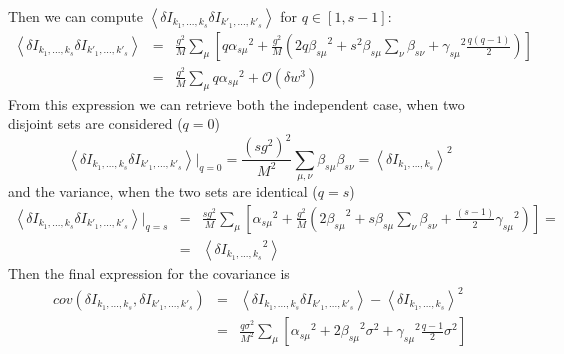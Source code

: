 \documentclass[11pt,letterpaper]{article}
\begin{document}
Then we can compute $\left\langle \delta I_{k_{1},...,k_{s}} \delta I_{k'_{1},...,k'_{s}} \right\rangle$ for $q\in [1,s-1]$:
\begin{eqnarray*}
     \left\langle \delta I_{k_{1},...,k_{s}} \delta I_{k'_{1},...,k'_{s}} \right\rangle &
    = & \frac{g^{2}}{M}\sum_{\mu}\left[ q{\alpha_{s\mu}}^{2} + \frac{g^{2}}{M}\left( 2q{\beta_{s\mu}}^{2} + s^{2} \beta_{s\mu}\sum_{\nu} \beta_{s\nu} + {\gamma_{s\mu}}^{2}\frac{q(q-1)}{2}\right)\right]\\
    &=& \frac{g^{2}}{M}\sum_{\mu} q{\alpha_{s\mu}}^{2} + \mathcal{O}(\delta w^3)
\end{eqnarray*}
From this expression we can retrieve both the independent case, when two disjoint sets are considered ($q=0$)
\begin{equation*}
    \left\langle \delta I_{k_{1},...,k_{s}} \delta I_{k'_{1},...,k'_{s}} \right\rangle\biggl|_{q=0} = \frac{(sg^{2})^{2}}{M^{2}} \sum_{\mu,\nu}\beta_{s\mu} \beta_{s\nu} =
    \left\langle \delta I_{k_{1},...,k_{s}}\right\rangle^{2}
\end{equation*}
and the variance, when the two sets are identical ($q=s$) 
\begin{eqnarray*}
    \left\langle \delta I_{k_{1},...,k_{s}} \delta I_{k'_{1},...,k'_{s}} \right\rangle\biggl|_{q=s} & = & \frac{sg^{2}}{M} \sum_{\mu} \left[ {\alpha_{s\mu}}^{2} + \frac{g^{2}}{M} \left(2 {\beta_{s\mu}}^{2} + s \beta_{s\mu} \sum_{\nu} \beta_{s\nu} + \frac{\left(s-1\right)}{2} {\gamma_{s\mu}}^{2}\right)\right] =\\ & = & \left\langle {\delta I_{k_{1},...,k_{s}}}^{2} \right\rangle 
\end{eqnarray*}
Then the final expression for the covariance is 
\begin{eqnarray*}
    cov(\delta I_{k_{1},...,k_{s}}, \delta I_{k'_{1},...,k'_{s}}) & = & \left\langle \delta I_{k_{1},...,k_{s}} \delta I_{k'_{1},...,k'_{s}} \right\rangle- \left\langle \delta I_{k_{1},...,k_{s}}\right\rangle^{2}\\
    \
    & = &\frac{q\sigma^{2}}{M^{2}}\sum_{\mu}\left[ {\alpha_{s\mu}}^{2} + 2{\beta_{s\mu}}^{2}\sigma^{2} + {\gamma_{s\mu}}^{2}\frac{q-1}{2}\sigma^{2}\right]
\end{eqnarray*}
\end{document}

